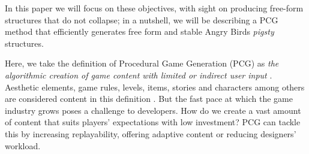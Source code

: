 \documentclass[runningheads,a4paper]{llncs}
\begin{document}
In this paper we will focus on 
these objectives, with sight
on producing free-form structures that do not collapse; in a nutshell,
we will be describing a PCG method that efficiently generates free
form and stable Angry Birds {\em pigsty} structures.




Here, we take the definition of Procedural Game Generation
(PCG) as \textit{the algorithmic creation of game content with
  limited or indirect user input} \cite{togelius2011procedural}. 
Aesthetic elements, game rules, levels, items, stories and characters
among others are considered content in this definition  
 \cite{togelius2011procedural}. %
%
But the fast pace at which the game industry grows poses a challenge to developers. 
How do we create a vast amount of content that suits 
players' expectations with low investment? PCG can tackle this by  
increasing replayability, offering adaptive content or reducing designers' 
workload. \cite{togelius2016introduction}
\end{document}
